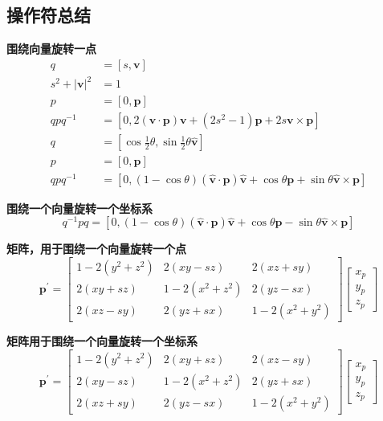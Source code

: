 \subsection{操作符总结}
\textbf{围绕向量旋转一点}
$$
\begin{aligned}
q & =[s, \mathbf{v}] \\
s^{2}+|\mathbf{v}|^{2} & =1 \\
p & =[0, \mathbf{p}] \\
q p q^{-1} & =\left[0,2(\mathbf{v} \cdot \mathbf{p}) \mathbf{v}+\left(2 s^{2}-1\right) \mathbf{p}+2 s \mathbf{v} \times \mathbf{p}\right] \\
q & =\left[\cos \frac{1}{2} \theta, \sin \frac{1}{2} \theta \hat{\mathbf{v}}\right] \\
p & =[0, \mathbf{p}] \\
q p q^{-1} & =[0,(1-\cos \theta)(\hat{\mathbf{v}} \cdot \mathbf{p}) \hat{\mathbf{v}}+\cos \theta \mathbf{p}+\sin \theta \hat{\mathbf{v}} \times \mathbf{p}]
\end{aligned}
$$

\textbf{围绕一个向量旋转一个坐标系}
$$
q^{-1} p q=[0,(1-\cos \theta)(\hat{\mathbf{v}} \cdot \mathbf{p}) \hat{\mathbf{v}}+\cos \theta \mathbf{p}-\sin \theta \hat{\mathbf{v}} \times \mathbf{p}]
$$

\textbf{矩阵，用于围绕一个向量旋转一个点}
$$
\mathbf{p}^{\prime}=\left[\begin{array}{ccc}
1-2\left(y^{2}+z^{2}\right) & 2(x y-s z) & 2(x z+s y) \\
2(x y+s z) & 1-2\left(x^{2}+z^{2}\right) & 2(y z-s x) \\
2(x z-s y) & 2(y z+s x) & 1-2\left(x^{2}+y^{2}\right)
\end{array}\right]\left[\begin{array}{c}
x_{p} \\
y_{p} \\
z_{p}
\end{array}\right]
$$

\textbf{矩阵用于围绕一个向量旋转一个坐标系}
$$
\mathbf{p}^{\prime}=\left[\begin{array}{ccc}
1-2\left(y^{2}+z^{2}\right) & 2(x y+s z) & 2(x z-s y) \\
2(x y-s z) & 1-2\left(x^{2}+z^{2}\right) & 2(y z+s x) \\
2(x z+s y) & 2(y z-s x) & 1-2\left(x^{2}+y^{2}\right)
\end{array}\right]\left[\begin{array}{l}
x_{p} \\
y_{p} \\
z_{p}
\end{array}\right]
$$

